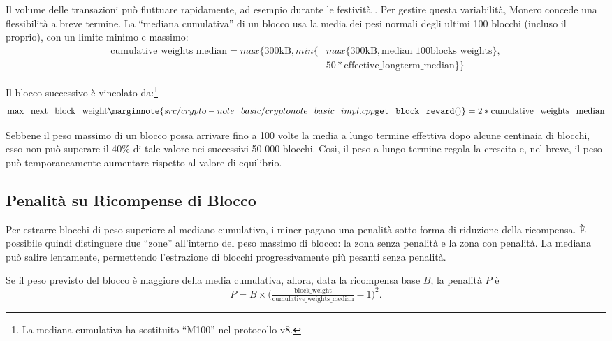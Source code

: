 Il volume delle transazioni può fluttuare rapidamente, ad esempio durante le festività \cite{visa-seasonality}. Per gestire questa variabilità, Monero concede una flessibilità a breve termine. La “mediana cumulativa” di un blocco usa la media dei pesi normali degli ultimi 100 blocchi (incluso il proprio), con un limite minimo e massimo:\vspace{.1cm}
\begin{align*}
    \textrm{cumulative\_weights\_median} = max\{\textrm{300kB}, min\{&max\{\textrm{300kB}, \textrm{median\_100blocks\_weights}\},\\
    &50*\textrm{effective\_longterm\_median}\}\}%
\end{align*}{}

Il blocco successivo è vincolato da:\footnote{La mediana cumulativa ha sostituito “M100” nel protocollo v8.}\vspace{.1cm}
\[\textrm{max\_next\_block\_weight}\marginnote{src/crypto- note\_basic/ cryptonote\_ basic\_ impl.cpp {\tt get\_block\_ reward()}} = 2*\textrm{cumulative\_weights\_median}\]%

Sebbene il peso massimo di un blocco possa arrivare fino a 100 volte la media a lungo termine effettiva dopo alcune centinaia di blocchi, esso non può superare il 40\% di tale valore nei successivi 50 000 blocchi. Così, il peso a lungo termine regola la crescita e, nel breve, il peso può temporaneamente aumentare rispetto al valore di equilibrio.


\subsection{Penalità su Ricompense di Blocco}
\label{subsec:penalty}

Per estrarre blocchi di peso superiore al mediano cumulativo, i miner pagano una penalità sotto forma di riduzione della ricompensa. È possibile quindi distinguere due “zone” all’interno del peso massimo di blocco: la zona senza penalità e la zona con penalità. La mediana può salire lentamente, permettendo l'estrazione di blocchi progressivamente più pesanti senza penalità.

Se il peso previsto del blocco è maggiore della media cumulativa, allora, data la ricompensa base $B$, la penalità $P$ è\vspace{.1cm}
\[P = B \times \bigl(\tfrac{\text{block\_weight}}{\text{cumulative\_weights\_median}} - 1\bigr)^2.\]

